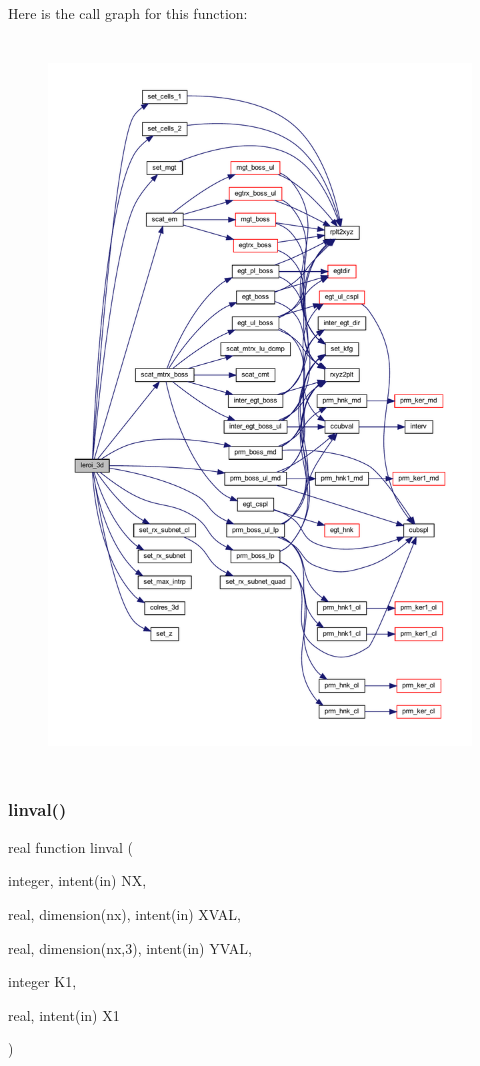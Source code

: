 Here is the call graph for this function\+:\nopagebreak
\begin{figure}[H]
\begin{center}
\leavevmode
\includegraphics[height=550pt]{Leroi__c_8f90_ad3c98b0aa8032dd5e2c3fce9417d4512_cgraph}
\end{center}
\end{figure}
\mbox{\label{Leroi__c_8f90_accb3ec8ce6fe855a60b0c1959fc6e2c8}} 
\subsubsection{\texorpdfstring{linval()}{linval()}}
{\footnotesize\ttfamily real function linval (\begin{DoxyParamCaption}\item[{integer, intent(in)}]{NX,  }\item[{real, dimension(nx), intent(in)}]{X\+V\+AL,  }\item[{real, dimension(nx,3), intent(in)}]{Y\+V\+AL,  }\item[{integer}]{K1,  }\item[{real, intent(in)}]{X1 }\end{DoxyParamCaption})}

